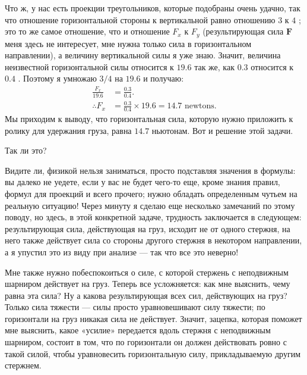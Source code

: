\documentclass[11pt,oneside]{article}
\providecommand{\FLPF}{\mathbf{F}}
\begin{document}
Что ж, у нас есть проекции треугольников, которые подобраны очень удачно, так что отношение горизонтальной стороны к вертикальной равно отношению \(3\) к \(4\) ; это то же самое отношение, что и отношение \(F_x\) к \(F_y\) (результирующая сила \(\FLPF\) меня здесь не интересует, мне нужна только сила в горизонтальном направлении), а величину вертикальной силы я уже знаю. Значит, величина неизвестной горизонтальной силы относится к \(19.6\) так же, как \(0.3\) относится к \(0.4\) . Поэтому я умножаю \(3/4\) на \(19.6\) и получаю: 
\begin{equation*} \begin{aligned} \frac{F_x}{19.6} &= \frac{0.3}{0.4}.\\[1.5ex] \therefore F_x &= \frac{0.3}{0.4} \times 19.6 = 14.7\text{ newtons}. \end{aligned} \tag{1.20}
\label{Eq:TIPS:1:20} \end{equation*}
 Мы приходим к выводу, что горизонтальная сила, которую нужно приложить к ролику для удержания груза, равна \(14.7\) ньютонам. Вот и решение этой задачи.\par

Так ли это?\par

Видите ли, физикой нельзя заниматься, просто подставляя значения в формулы: вы далеко не уедете, если у вас не будет чего-то еще, кроме знания правил, формул для проекций и всего прочего; нужно обладать определенным чутьем на реальную ситуацию! Через минуту я сделаю еще несколько замечаний по этому поводу, но здесь, в этой конкретной задаче, трудность заключается в следующем: результирующая сила, действующая на груз, исходит не от одного стержня, на него также действует сила со стороны другого стержня в некотором направлении, а я упустил это из виду при анализе --- так что все это неверно!\par

Мне также нужно побеспокоиться о силе, с которой стержень с неподвижным шарниром действует на груз. Теперь все усложняется: как мне выяснить, чему равна эта сила? Ну а какова результирующая всех сил, действующих на груз? Только сила тяжести --- силы просто уравновешивают силу тяжести; по горизонтали на груз никакая сила не действует. Значит, зацепка, которая поможет мне выяснить, какое «усилие» передается вдоль стержня с неподвижным шарниром, состоит в том, что по горизонтали он должен действовать ровно с такой силой, чтобы уравновесить горизонтальную силу, прикладываемую другим стержнем.\par
\end{document}
